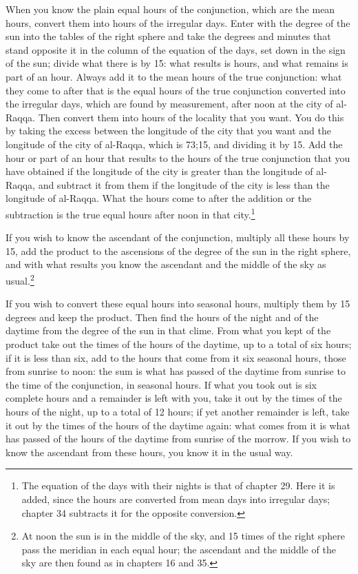 \documentclass[11pt]{article}
\begin{document}
\par When you know the plain equal hours of the conjunction, which are the mean hours, convert them into hours of the irregular days. Enter with the degree of the sun into the tables of the right sphere and take the degrees and minutes that stand opposite it in the column of the equation of the days, set down in the sign of the sun; divide what there is by 15: what results is hours, and what remains is part of an hour. Always add it to the mean hours of the true conjunction: what they come to after that is the equal hours of the true conjunction converted into the irregular days, which are found by measurement, after noon at the city of al-Raqqa. Then convert them into hours of the locality that you want. You do this by taking the excess between the longitude of the city that you want and the longitude of the city of al-Raqqa, which is 73;15, and dividing it by 15. Add the hour or part of an hour that results to the hours of the true conjunction that you have obtained if the longitude of the city is greater than the longitude of al-Raqqa, and subtract it from them if the longitude of the city is less than the longitude of al-Raqqa. What the hours come to after the addition or the subtraction is the true equal hours after noon in that city.\footnote{The equation of the days with their nights is that of chapter 29. Here it is added, since the hours are converted from mean days into irregular days; chapter 34 subtracts it for the opposite conversion.}\par
\par If you wish to know the ascendant of the conjunction, multiply all these hours by 15, add the product to the ascensions of the degree of the sun in the right sphere, and with what results you know the ascendant and the middle of the sky as usual.\footnote{At noon the sun is in the middle of the sky, and 15 times of the right sphere pass the meridian in each equal hour; the ascendant and the middle of the sky are then found as in chapters 16 and 35.}\par
\par If you wish to convert these equal hours into seasonal hours, multiply them by 15 degrees and keep the product. Then find the hours of the night and of the daytime from the degree of the sun in that clime. From what you kept of the product take out the times of the hours of the daytime, up to a total of six hours; if it is less than six, add to the hours that come from it six seasonal hours, those from sunrise to noon: the sum is what has passed of the daytime from sunrise to the time of the conjunction, in seasonal hours. If what you took out is six complete hours and a remainder is left with you, take it out by the times of the hours of the night, up to a total of 12 hours; if yet another remainder is left, take it out by the times of the hours of the daytime again: what comes from it is what has passed of the hours of the daytime from sunrise of the morrow. If you wish to know the ascendant from these hours, you know it in the usual way.\par
\end{document}
